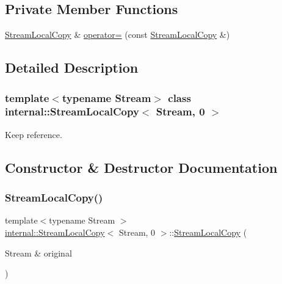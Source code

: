 \subsection*{Private Member Functions}
\begin{DoxyCompactItemize}
\item 
\hyperlink{classinternal_1_1StreamLocalCopy}{Stream\+Local\+Copy} \& \hyperlink{classinternal_1_1StreamLocalCopy_3_01Stream_00_010_01_4_a951778536f05d1f818f67c1c0342858c}{operator=} (const \hyperlink{classinternal_1_1StreamLocalCopy}{Stream\+Local\+Copy} \&)
\end{DoxyCompactItemize}


\subsection{Detailed Description}
\subsubsection*{template$<$typename Stream$>$\newline
class internal\+::\+Stream\+Local\+Copy$<$ Stream, 0 $>$}

Keep reference. 

\subsection{Constructor \& Destructor Documentation}
\mbox{\label{classinternal_1_1StreamLocalCopy_3_01Stream_00_010_01_4_ac684a7be07d79d6ddd274dc1150f4b79}} 
\subsubsection{\texorpdfstring{Stream\+Local\+Copy()}{StreamLocalCopy()}}
{\footnotesize\ttfamily template$<$typename Stream $>$ \\
\hyperlink{classinternal_1_1StreamLocalCopy}{internal\+::\+Stream\+Local\+Copy}$<$ Stream, 0 $>$\+::\hyperlink{classinternal_1_1StreamLocalCopy}{Stream\+Local\+Copy} (\begin{DoxyParamCaption}\item[{Stream \&}]{original }\end{DoxyParamCaption})\hspace{0.3cm}{\ttfamily [inline]}}




